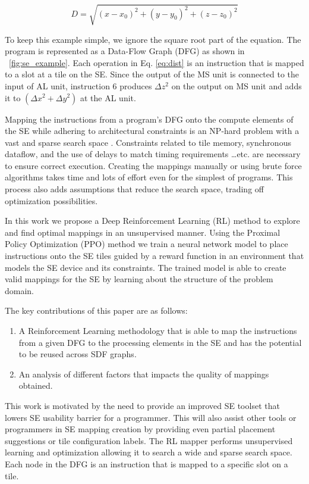 \begin{equation}
    \label{eq:dist}
    D = \sqrt{(x - x_0)^2 +(y - y_0)^2 + (z - z_0)^2}
\end{equation}

To keep this example simple, we ignore the square root part of the equation.
The program is represented as a Data-Flow Graph (DFG) as shown in \figurename~\ref{fig:se_example}.
Each operation in Eq. \ref{eq:dist} is an instruction that is mapped to a slot at a tile on the SE.
Since the output of the MS unit is connected to the input of AL unit, instruction 6 produces $\Delta z^2$ on the output on MS unit and adds it to $(\Delta x^2 + \Delta y^2)$ at the AL unit.


Mapping the instructions from a program's DFG onto the compute elements of the SE while adhering to architectural constraints is an NP-hard problem with a vast and sparse search space \cite{10.1007/3-540-69346-7_30}. 
Constraints related to tile memory, synchronous dataflow, and the use of delays to match timing requirements \dots etc. are necessary to ensure correct execution. 
Creating the mappings manually or using brute force algorithms takes time and lots of effort even for the simplest of programs. 
This process also adds assumptions that reduce the search space, trading off optimization possibilities.  

In this work we propose a Deep Reinforcement Learning (RL) method to explore and find optimal mappings in an unsupervised manner. 
Using the Proximal Policy Optimization (PPO) method we train a neural network model to place instructions onto the SE tiles guided by a reward function in an environment that models the SE device and its constraints. 
The trained model is able to create valid mappings for the SE by learning about the structure of the problem domain. 


The key contributions of this paper are as follows:
\begin{enumerate}
    \item A Reinforcement Learning methodology that is able to map the instructions from a given DFG to the processing elements in the SE and has the potential to be reused across SDF graphs.
    \item An analysis of different factors that impacts the quality of mappings obtained.
\end{enumerate}

This work is motivated by the need to provide an improved SE toolset that lowers SE usability barrier for a programmer.
This will also assist other tools or programmers in SE mapping creation by providing even partial placement suggestions or tile configuration labels.
The RL mapper performs unsupervised learning and optimization allowing it to search a wide and sparse search space. 
Each node in the DFG is an instruction that is mapped to a specific slot on a tile.

